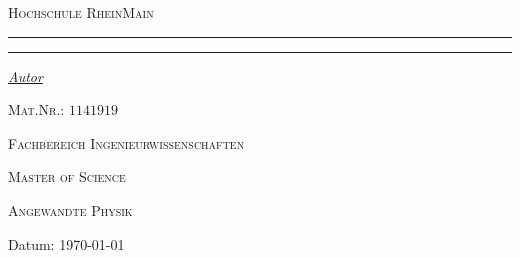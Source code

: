 \begin{titlepage}
	\newcommand{\HRule}{\rule{\linewidth}{0.5mm}}
	\centering
	\textsc{\Large Hochschule RheinMain} \par

	\begin{center}
		
	\end{center}
	\textsc{\LARGE \titleLV}\vspace{0.5cm}
	\HRule\vspace{0.6cm}
	{\huge\bfseries \subtitleA}\par\vspace{0.4cm} %
	{\huge\bfseries \subtitleB}\par\vspace{0.4cm}
	\HRule\vspace{1.5cm}
	\begin{minipage}{0.4\textwidth}
		\centering
		\Large
		\textit{\underline{Autor}}\par\vspace{0.5cm}
		\textsc{\nameA}\par\vspace{0.25cm}
		\large
		\textsc{Mat.Nr.: \(1141919\)}\par\vspace{2cm}
	\end{minipage}
	\vfill\vfill\vfill
	\textsc{\Large Fachbereich Ingenieurwissenschaften}\par\vspace{0.5cm}\par
	\textsc{\large Master of Science}\par\vspace{0.5cm}
	\textsc{\large Angewandte Physik}\par\vspace{0.2cm}
	\vfill
	\begin{flushleft}
		Datum:\hspace{0.4cm} {\large\today}
	\end{flushleft}
\end{titlepage}
